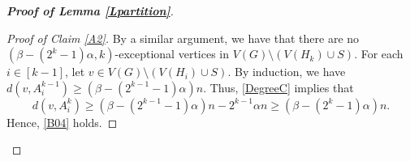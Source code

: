\documentclass[11pt, a4paper]{article}
\theoremstyle{definition}
\newcommand{\<}{\subseteq}
\begin{document}
\begin{proof}[\bf Proof of Lemma \ref{Lpartition}]
\begin{proof}[Proof of Claim \ref{A2}]
By a similar argument, we have that there are no $(\beta-(2^{k}-1)\alpha,k)$-exceptional vertices in $V(G)\setminus(V(H_k)\cup S)$. For each $i\in [k-1]$, let $v\in V(G)\setminus (V(H_i)\cup S)$. By induction, we have $d(v,A_i^{k-1})\ge (\beta -(2^{k-1}-1)\alpha)n$. Thus, \eqref{DegreeC} implies that 
$$d(v,A_i^{k})\ge (\beta -(2^{k-1}-1)\alpha)n-2^{k-1}\alpha n\ge (\beta-(2^{k}-1)\alpha)n.$$ Hence, \ref{B04} holds. %
\end{proof}




\end{proof}
\end{document}
